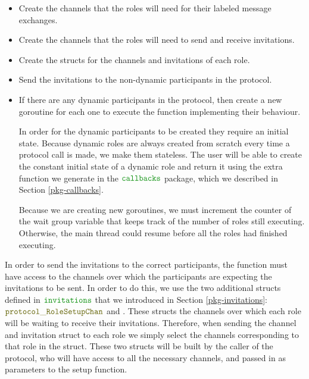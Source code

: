 \documentclass[12pt,twoside]{report}
\begin{document}
\begin{itemize}
    \item Create the channels that the roles will need for their labeled message exchanges.
    \item Create the channels that the roles will need to send and receive invitations.
    \item Create the structs for the channels and invitations of each role.
    \item Send the invitations to the non-dynamic participants in the protocol.
    \item If there are any dynamic participants in the protocol, then create a new goroutine for each one to execute the function implementing their behaviour.
    
    In order for the dynamic participants to be created they require an initial state. Because dynamic roles are always created from scratch every time a protocol call is made, we make them stateless. The user will be able to create the constant initial state of a dynamic role and return it using the extra function we generate in the $\pkgname{callbacks}$ package, which we described in Section \ref{pkg-callbacks}.

    Because we are creating new goroutines, we must increment the counter of the wait group variable that keeps track of the number of roles still executing. Otherwise, the main thread could resume before all the roles had finished executing.
\end{itemize}

In order to send the invitations to the correct participants, the function must have access to the channels over which the participants are expecting the invitations to be sent. In order to do this, we use the two additional structs defined in $\pkgname{invitations}$ that we introduced in Section \ref{pkg-invitations}: $\structname{protocol\_RoleSetupChan}$ and {\color{dkyellow} \texttt{}}. These structs the channels over which each role will be waiting to receive their invitations. Therefore, when sending the channel and invitation struct to each role we simply select the channels corresponding to that role in the struct. These two structs will be built by the caller of the protocol, who will have access to all the necessary channels, and passed in as parameters to the setup function.
\end{document}
